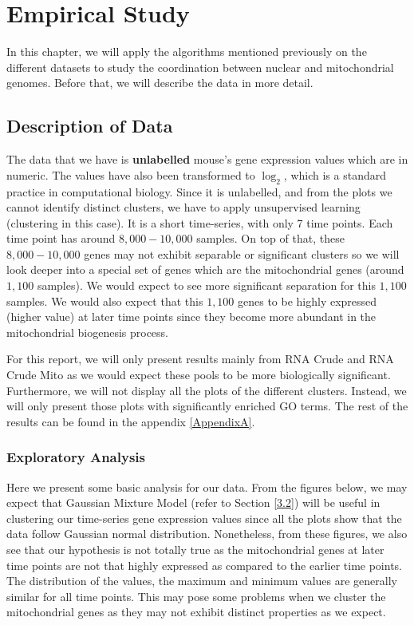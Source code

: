 
\chapter{Empirical Study}
\setlength{\belowdisplayskip}{1pt} \setlength{\belowdisplayshortskip}{1pt}
\setlength{\abovedisplayskip}{1pt} \setlength{\abovedisplayshortskip}{1pt}

In this chapter, we will apply the algorithms mentioned previously on the different datasets to study the coordination between nuclear and mitochondrial genomes. Before that, we will describe the data in more detail.

\section{Description of Data}
The data that we have is \textbf{unlabelled} mouse’s gene expression values which are in numeric. The values have also been transformed to $\log_2$, which is a standard practice in computational biology. Since it is unlabelled, and from the plots we cannot identify distinct clusters, we have to apply unsupervised learning (clustering in this case). It is a short time-series, with only 7 time points. Each time point has around $8,000-10,000$ samples. On top of that, these $8,000-10,000$ genes may not exhibit separable or significant clusters so we will look deeper into a special set of genes which are the mitochondrial genes (around $1,100$ samples). We would expect to see more significant separation for this $1,100$ samples. We would also expect that this $1,100$ genes to be highly expressed (higher value) at later time points since they become more abundant in the mitochondrial biogenesis process.

For this report, we will only present results mainly from RNA Crude and RNA Crude Mito as we would expect these pools to be more biologically significant. Furthermore, we will not display all the plots of the different clusters. Instead, we will only present those plots with significantly enriched GO terms. The rest of the results can be found in the appendix \ref{AppendixA}.

\subsection{Exploratory Analysis}
Here we present some basic analysis for our data. From the figures below, we may expect that Gaussian Mixture Model (refer to Section \ref{3.2}) will be useful in clustering our time-series gene expression values since all the plots show that the data follow Gaussian normal distribution. Nonetheless, from these figures, we also see that our hypothesis is not totally true as the mitochondrial genes at later time points are not that highly expressed as compared to the earlier time points. The distribution of the values, the maximum and minimum values are generally similar for all time points. This may pose some problems when we cluster the mitochondrial genes as they may not exhibit distinct properties as we expect.
		
